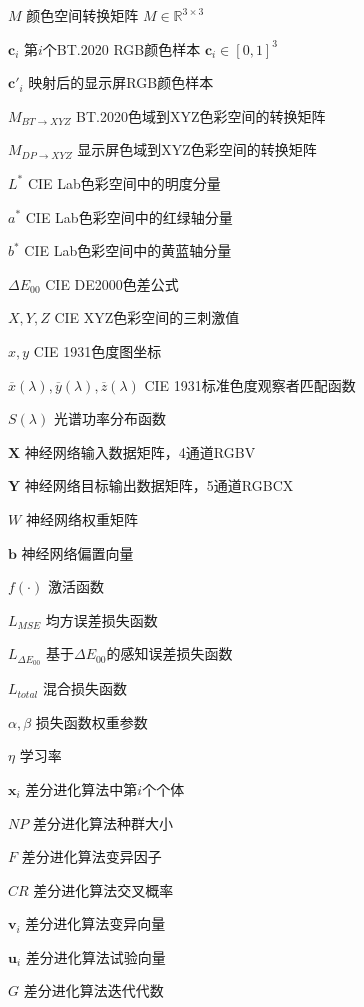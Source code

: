 \begin{denotation}[0mm][15mm]
	\item[$M$] 颜色空间转换矩阵 $M\in \mathbb{R}^{3\times 3}$
	\item[$\mathbf{c}_i$] 第$i$个BT.2020 RGB颜色样本 $\mathbf{c}_i \in [0,1]^3$
	\item[$\mathbf{c}'_i$] 映射后的显示屏RGB颜色样本
	\item[$M_{BT\rightarrow XYZ}$] BT.2020色域到XYZ色彩空间的转换矩阵
	\item[$M_{DP\rightarrow XYZ}$] 显示屏色域到XYZ色彩空间的转换矩阵
	\item[$L^*$] CIE Lab色彩空间中的明度分量
	\item[$a^*$] CIE Lab色彩空间中的红绿轴分量
	\item[$b^*$] CIE Lab色彩空间中的黄蓝轴分量
	\item[$\Delta E_{00}$] CIE DE2000色差公式
	\item[$X, Y, Z$] CIE XYZ色彩空间的三刺激值
	\item[$x, y$] CIE 1931色度图坐标
	\item[$\overline{x}(\lambda), \overline{y}(\lambda), \overline{z}(\lambda)$] CIE 1931标准色度观察者匹配函数
	\item[$S(\lambda)$] 光谱功率分布函数
	
	\item[$\mathbf{X}$] 神经网络输入数据矩阵，4通道RGBV
	\item[$\mathbf{Y}$] 神经网络目标输出数据矩阵，5通道RGBCX
	\item[$W$] 神经网络权重矩阵
	\item[$\mathbf{b}$] 神经网络偏置向量
	\item[$f(\cdot)$] 激活函数
	\item[$L_{MSE}$] 均方误差损失函数
	\item[$L_{\Delta E_{00}}$] 基于$\Delta E_{00}$的感知误差损失函数
	\item[$L_{total}$] 混合损失函数
	\item[$\alpha, \beta$] 损失函数权重参数
	\item[$\eta$] 学习率
	
	\item[$\mathbf{x}_i$] 差分进化算法中第$i$个个体
	\item[$NP$] 差分进化算法种群大小
	\item[$F$] 差分进化算法变异因子
	\item[$CR$] 差分进化算法交叉概率
	\item[$\mathbf{v}_i$] 差分进化算法变异向量
	\item[$\mathbf{u}_i$] 差分进化算法试验向量
	\item[$G$] 差分进化算法迭代代数
	

\end{denotation}
